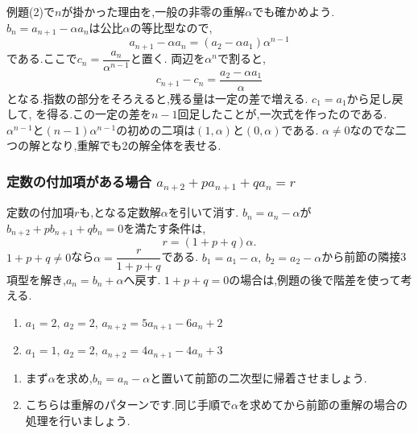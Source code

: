 例題(2)で$n$が掛かった理由を,一般の非零の重解$\alpha$でも確かめよう.
$b_n=a_{n+1}-\alpha a_n$は公比$\alpha$の等比型なので,
\[
  a_{n+1}-\alpha a_n=(a_2-\alpha a_1)\alpha^{n-1}
\]
である.ここで$c_n=\dfrac{a_n}{\alpha^{n-1}}$と置く.
両辺を$\alpha^n$で割ると,
\[
  c_{n+1}-c_n=\frac{a_2-\alpha a_1}{\alpha}
\]
となる.指数の部分をそろえると,残る量は一定の差で増える.
$c_1=a_1$から足し戻して,
\BookMathLayout{\[
    a_n=\left\{a_1+(n-1)\left(\frac{a_2}{\alpha}-a_1\right)\right\}\alpha^{n-1}
  \]}{\[
    \begin{aligned}
      a_n&=\left\{a_1+(n-1)\left(\frac{a_2}{\alpha}-a_1\right)\right\}\\
      &\qquad\cdot\alpha^{n-1}
    \end{aligned}
  \]}
を得る.この一定の差を$n-1$回足したことが,一次式を作ったのである.
$\alpha^{n-1}$と$(n-1)\alpha^{n-1}$の初めの二項は$(1,\alpha)$と$(0,\alpha)$である.
$\alpha\ne0$なのでな二つの解となり,重解でも2の解全体を表せる.

\subsubsection{\texorpdfstring{定数の付加項がある場合  $\displaystyle a_{n+2}+pa_{n+1}+qa_n=r$}{定数の付加項がある場合}}\label{節：定数の付加項がある場合}
定数の付加項$r$も,となる定数解$\alpha$を引いて消す.
$b_n=a_n-\alpha$が$b_{n+2}+pb_{n+1}+qb_n=0$を満たす条件は,
\[
  r=(1+p+q)\alpha.
\]
$1+p+q\ne0$なら$\alpha=\dfrac{r}{1+p+q}$である.
$b_1=a_1-\alpha,\ b_2=a_2-\alpha$から前節の隣接3項型を解き,$a_n=b_n+\alpha$へ戻す.
$1+p+q=0$の場合は,例題の後で階差を使って考える.

\noindent {}\par\nobreak
\begin{enumerate}[label=(\arabic*),parsep=3pt,format=\bookitemlink{example-three-term-2}{problem}{answer}]
  \item $\displaystyle a_1=2,\,a_2=2,\, a_{n+2}=5a_{n+1}-6a_n+2$
  \item $\displaystyle a_1=1,\,a_2=2,\, a_{n+2}=4a_{n+1}-4a_n+3$
\end{enumerate}

\noindent{}\par\nobreak
\begin{enumerate}[label=(\arabic*),parsep=3pt,format=\bookitemlink{example-three-term-2}{hint}{problem}]
  \item まず$\alpha$を求め,$b_n=a_n-\alpha$と置いて前節の二次型に帰着させましょう.
  \item こちらは重解のパターンです.同じ手順で$\alpha$を求めてから前節の重解の場合の処理を行いましょう.
\end{enumerate}

